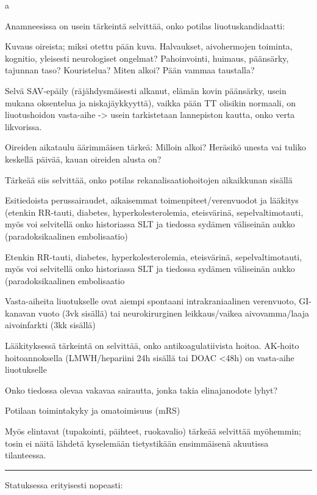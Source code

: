\documentclass[
]{book}
\begin{document}
a

Anamneesissa on usein tärkeintä selvittää, onko potilas liuotuskandidaatti:

Kuvaus oireista; miksi otettu pään kuva. Halvaukset, aivohermojen toiminta, kognitio, yleisesti neurologiset ongelmat? Pahoinvointi, huimaus, päänsärky, tajunnan taso? Kouristelua? Miten alkoi? Pään vammaa taustalla?

Selvä SAV-epäily (räjähdysmäisesti alkanut, elämän kovin päänsärky, usein mukana oksentelua ja niskajäykkyyttä), vaikka pään TT olisikin normaali, on liuotushoidon vasta-aihe -\textgreater{} usein tarkistetaan lannepiston kautta, onko verta likvorissa.

Oireiden aikataulu äärimmäisen tärkeä: Milloin alkoi? Heräsikö unesta vai tuliko keskellä päivää, kauan oireiden alusta on?

Tärkeää siis selvittää, onko potilas rekanalisaatiohoitojen aikaikkunan sisällä

Esitiedoista perussairaudet, aikaisemmat toimenpiteet/verenvuodot ja lääkitys (etenkin RR-tauti, diabetes, hyperkolesterolemia, eteisvärinä, sepelvaltimotauti, myös voi selvitellä onko historiassa SLT ja tiedossa sydämen väliseinän aukko (paradoksikaalinen embolisaatio)

Etenkin RR-tauti, diabetes, hyperkolesterolemia, eteisvärinä, sepelvaltimotauti, myös voi selvitellä onko historiassa SLT ja tiedossa sydämen väliseinän aukko (paradoksikaalinen embolisaatio

Vasta-aiheita liuotukselle ovat aiempi spontaani intrakraniaalinen verenvuoto, GI-kanavan vuoto (3vk sisällä) tai neurokirurginen leikkaus/vaikea aivovamma/laaja aivoinfarkti (3kk sisällä)

Lääkityksessä tärkeintä on selvittää, onko antikoagulatiivista hoitoa. AK-hoito hoitoannoksella (LMWH/hepariini 24h sisällä tai DOAC \textless48h) on vasta-aihe liuotukselle

Onko tiedossa olevaa vakavaa sairautta, jonka takia elinajanodote lyhyt?

Potilaan toimintakyky ja omatoimisuus (mRS)

Myös elintavat (tupakointi, päihteet, ruokavalio) tärkeää selvittää myöhemmin; tosin ei näitä lähdetä kyselemään tietystikään ensimmäisenä akuutissa tilanteessa.

\begin{center}\rule{0.5\linewidth}{0.5pt}\end{center}

Statuksessa erityisesti nopeasti:
\end{document}
